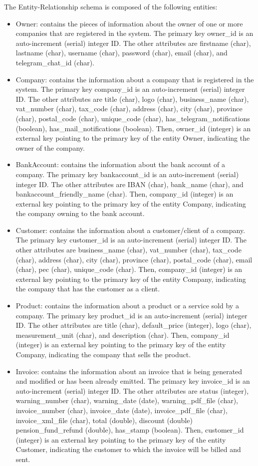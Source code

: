 The Entity-Relationship schema is composed of the following entities:
\begin{itemize}
 	\item Owner: contains the pieces of information about the owner of one or more companies that are registered in the system. The primary key owner\_id is an auto-increment (serial) integer ID. The other attributes are firstname (char), lastname (char), username (char), password (char), email (char), and telegram\_chat\_id (char).
	\item Company: contains the information about a company that is registered in the system. The primary key company\_id is an auto-increment (serial) integer ID. The other attributes are title (char), logo (char), business\_name (char), vat\_number (char), tax\_code (char), address (char), city (char), province (char), postal\_code (char), unique\_code (char), has\_telegram\_notifications (boolean), has\_mail\_notifications (boolean). Then, owner\_id (integer) is an external key pointing to the primary key of the entity Owner, indicating the owner of the company.
	\item BankAccount: contains the information about the bank account of a company. The primary key bankaccount\_id is an auto-increment (serial) integer ID. The other attributes are IBAN (char), bank\_name (char), and bankaccount\_friendly\_name (char). Then, company\_id (integer) is an external key pointing to the primary key of the entity Company, indicating the company owning to the bank account.
   	\item Customer: contains the information about a customer/client of a company. The primary key customer\_id is an auto-increment (serial) integer ID. The other attributes are business\_name (char), vat\_number (char), tax\_code (char), address (char), city (char), province (char), postal\_code (char), email (char), pec (char), unique\_code (char). Then, company\_id (integer) is an external key pointing to the primary key of the entity Company, indicating the company that has the customer as a client.
   	\item Product: contains the information about a product or a service sold by a company. The primary key product\_id is an auto-increment (serial) integer ID. The other attributes are title (char), default\_price (integer), logo (char), measurement\_unit (char), and description (char). Then, company\_id (integer) is an external key pointing to the primary key of the entity Company, indicating the company that sells the product.
	\item Invoice: contains the information about an invoice that is being generated and modified or has been already emitted. The primary key invoice\_id is an auto-increment (serial) integer ID. The other attributes are status (integer), warning\_number (char), warning\_date (date), warning\_pdf\_file (char), invoice\_number (char), invoice\_date (date), invoice\_pdf\_file (char), invoice\_xml\_file (char), total (double), discount (double) pension\_fund\_refund (double), has\_stamp (boolean). Then, customer\_id (integer) is an external key pointing to the primary key of the entity Customer, indicating the customer to which the invoice will be billed and sent.

\end{itemize}

